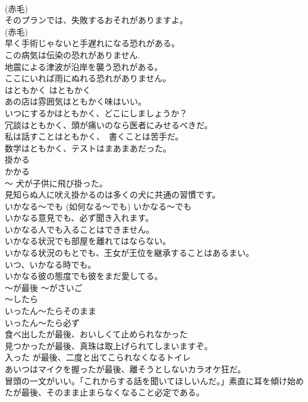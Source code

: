 \documentclass[8pt]{extreport}
\begin{document}
\begin{CJK}{UTF8}{min}
\\	(赤毛)
\\	そのプランでは、失敗するおそれがありますよ。  
\\	(赤毛)
\\	早く手術じゃないと手遅れになる恐れがある。  
\\	この病気は伝染の恐れがありません.  
\\	地震による津波が沿岸を襲う恐れがある。   
\\	ここにいれば雨にぬれる恐れがありません。   
\\	はともかく	はともかく	
\\	あの店は雰囲気はともかく味はいい。  
\\	いつにするかはともかく、どこにしましょうか？  
\\	冗談はともかく、頭が痛いのなら医者にみせるべきだ。  
\\	私は話すことはともかく、　書くことは苦手だ。  
\\	数学はともかく、テストはまあまあだった。  
\\	掛かる　
\\	かかる　
\\	〜	犬が子供に飛び掛った。
\\	見知らぬ人に吠え掛かるのは多くの犬に共通の習慣です。   
\\	いかなる〜でも (如何なる〜でも)	いかなる〜でも	
\\	いかなる意見でも、必ず聞き入れます。  
\\	いかなる人でも入ることはできません。  
\\	いかなる状況でも部屋を離れてはならない。  
\\	いかなる状況のもとでも、王女が王位を継承することはあるまい。  
\\	いつ、いかなる時でも。  
\\	いかなる彼の態度でも彼をまだ愛してる。  
\\	〜が最後	〜がさいご	
\\	〜したら 
\\	いったん〜たらそのまま 
\\	いったん〜たら必ず	
\\	食べ出したが最後、おいしくて止められなかった  
\\	見つかったが最後、真珠は取上げられてしまいますぞ。  
\\	入った が最後、二度と出てこられなくなるトイレ  
\\	あいつはマイクを握ったが最後、離そうとしないカラオケ狂だ。  
\\	冒頭の一文がいい。「これからする話を聞いてほしいんだ。」素直に耳を傾け始めたが最後、そのまま止まらなくなること必定である。  

\end{CJK}
\end{document}
